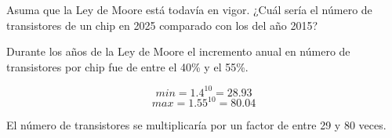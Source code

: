 \begin{acexercise}\end{acexercise}

Asuma que la Ley de Moore está todavía en vigor.
¿Cuál sería el número de transistores de un chip en 2025 comparado con los del año 2015?


\begin{acsolution}\end{acsolution}

Durante los años de la Ley de Moore el incremento anual en número de transistores por chip
fue de entre el 40\% y el 55\%.

\[min = 1.4^{10} = 28.93\]
\[max = 1.55^{10} = 80.04\]

El número de transistores se multiplicaría por un factor de entre 29 y 80 veces.
